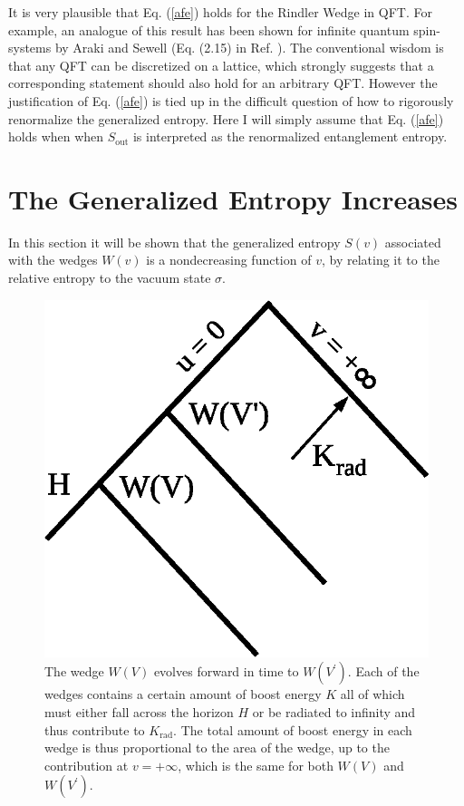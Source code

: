 \documentclass{article}
\begin{document}
It is very plausible that Eq. (\ref{afe}) holds for the Rindler Wedge in QFT.  For example, an analogue of this result has been shown for infinite quantum spin-systems by Araki and Sewell (Eq. (2.15) in Ref. \cite{AS77}).  The conventional wisdom is that any QFT can be discretized on a lattice, which strongly suggests that a corresponding statement should also hold for an arbitrary QFT.  However the justification of Eq. (\ref{afe}) is tied up in the difficult question of how to rigorously renormalize the generalized entropy.  Here I will simply assume that Eq. (\ref{afe}) holds when when $S_\mathrm{out}$ is interpreted as the renormalized entanglement entropy.

\section{The Generalized Entropy Increases}\label{form}

In this section it will be shown that the generalized entropy $S(v)$ associated with the wedges $W(v)$ is a nondecreasing function of $v$, by relating it to the relative entropy to the vacuum state $\sigma$.

\begin{figure}[ht]
\centering
\includegraphics[width=.75\textwidth]{increase.eps}
\caption{\footnotesize The wedge $W(V)$ evolves forward in time to $W(V^\prime)$.  Each of the wedges contains a certain amount of boost energy $K$ all of which must either fall across the horizon $H$ or be radiated to infinity and thus contribute to $K_\mathrm{rad}$.  The total amount of boost energy in each wedge is thus proportional to the area of the wedge, up to the contribution at $v = +\infty$, which is the same for both $W(V)$ and $W(V^\prime)$.} \label{increase}
\end{figure}
\end{document}
